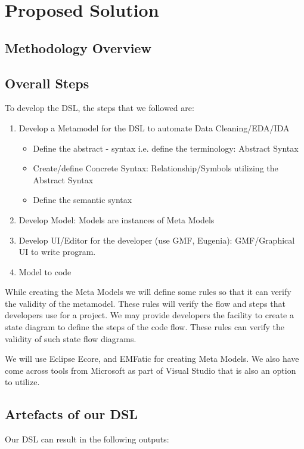 \section{Proposed Solution}

\subsection{Methodology Overview}

\subsection{Overall Steps}
To develop the DSL, the steps that we followed are:
\begin{enumerate}
	\item Develop a Metamodel for the DSL to automate Data Cleaning/EDA/IDA
		\begin{itemize}
			\item Define the abstract - syntax i.e. define the terminology: Abstract Syntax
			\item Create/define Concrete Syntax: Relationship/Symbols utilizing the Abstract Syntax
			\item Define the semantic syntax
		\end{itemize}
	\item Develop Model: Models are instances of Meta Models
	\item Develop UI/Editor for the developer (use GMF, Eugenia): GMF/Graphical UI to write program.
	\item Model to code %
\end{enumerate}

\flushleft \justify While creating the Meta Models we will define some rules so that it can verify the validity of the metamodel. These rules will verify the flow and steps that developers use for a project. We may provide developers the facility to create a state diagram to define the steps of the code flow. These rules can verify the validity of such state flow diagrams.

\flushleft \justify We will use Eclipse Ecore, and EMFatic for creating Meta Models. We also have come across tools from Microsoft as part of Visual Studio that is also an option to utilize.

\subsection{Artefacts of our DSL}
Our DSL can result in the following outputs:

